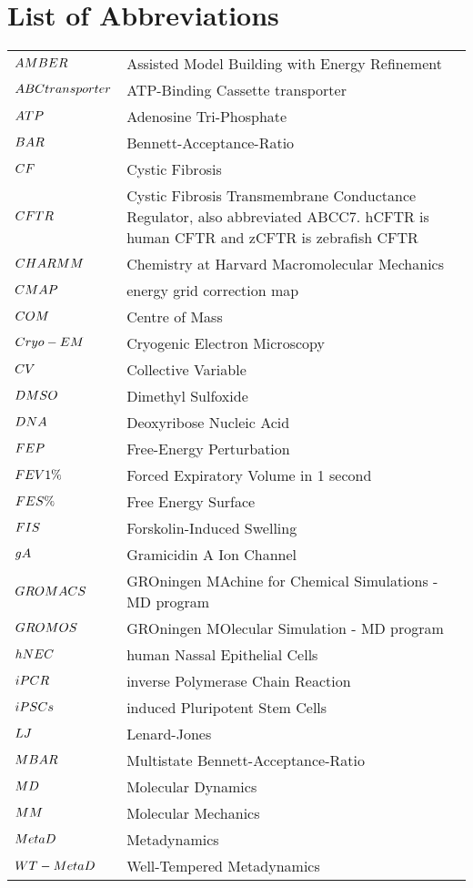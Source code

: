 \chapter*{List of Abbreviations}
\label{chap:abbrev}

\begin{center}
\begin{bfseries}
\newcommand\nomenclature[2]{#1 & #2 \\}
\begin{longtable}{@{}p{3cm}@{}p{\dimexpr\textwidth-1cm\relax}@{}}
\nomenclature{${\small AMBER}$}    {Assisted Model Building with Energy Refinement}
\nomenclature{${\small ABC transporter}$}  {ATP-Binding Cassette transporter}
\nomenclature{${\small ATP}$}      {Adenosine Tri-Phosphate}
\nomenclature{${\small BAR}$}      {Bennett-Acceptance-Ratio}
\nomenclature{${\small CF}$}        {Cystic Fibrosis}
\nomenclature{${\small CFTR}$}      {Cystic Fibrosis Transmembrane Conductance Regulator, also abbreviated ABCC7. hCFTR is human CFTR and zCFTR is zebrafish CFTR}
\nomenclature{${\small CHARMM}$}   {Chemistry at Harvard Macromolecular Mechanics}
\nomenclature{${\small CMAP}$}     {energy grid correction map}
\nomenclature{${\small COM}$}      {Centre of Mass}
\nomenclature{${\small Cryo-EM}$}  {Cryogenic Electron Microscopy}
\nomenclature{${\small CV}$}       {Collective Variable}
\nomenclature{${\small DMSO}$}     {Dimethyl Sulfoxide}
\nomenclature{${\small DNA}$}      {Deoxyribose Nucleic Acid}
\nomenclature{${\small FEP}$}      {Free-Energy Perturbation}
\nomenclature{${\small FEV1\%}$}   {Forced Expiratory Volume in 1 second}
\nomenclature{${\small FES\%}$}    {Free Energy Surface}
\nomenclature{${\small FIS}$}      {Forskolin-Induced Swelling}
\nomenclature{${\small gA}$}       {Gramicidin A Ion Channel}
\nomenclature{${\small GROMACS}$}  {GROningen MAchine for Chemical Simulations - MD program}
\nomenclature{${\small GROMOS}$}   {GROningen MOlecular Simulation - MD program}
\nomenclature{${\small hNEC}$}     {human Nassal Epithelial Cells}
\nomenclature{${\small iPCR}$}     {inverse Polymerase Chain Reaction}
\nomenclature{${\small iPSCs}$}    {induced Pluripotent Stem Cells}
\nomenclature{${\small LJ}$}       {Lenard-Jones}
\nomenclature{${\small MBAR}$}     {Multistate Bennett-Acceptance-Ratio}
\nomenclature{${\small MD}$}       {Molecular Dynamics}
\nomenclature{${\small MM}$}       {Molecular Mechanics}
\nomenclature{${\small MetaD}$}    {Metadynamics}
\nomenclature{${\small WT-MetaD}$} {Well-Tempered Metadynamics}

\end{longtable}
\end{bfseries}
\end{center}
